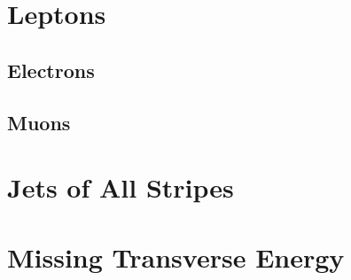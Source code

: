 
\section{Leptons} 

\subsection{Electrons} 

\subsection{Muons} 

\section{Jets of All Stripes} 

\section{Missing Transverse Energy} 



